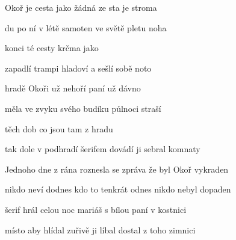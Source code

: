 

\zs
{} Okoř je cesta jako žádná ze sta  je stroma

 du po ní v létě samoten ve světě  pletu noha

 konci té cesty   krčma jako 

 zapadlí trampi hladoví a sešlí  sobě noto
\ks

\zr
{} hradě Okoři  už nehoří  paní  už dávno 

 měla ve zvyku  svého budíku  půlnoci  straší

 těch dob co jsou tam   z hradu 

 tak dole v podhradí  šerifem dovádí  ji sebral  komnaty 
\kr

\zs
Jednoho dne z rána roznesla se zpráva že byl Okoř vykraden

nikdo neví dodnes kdo to tenkrát odnes nikdo nebyl dopaden

šerif hrál celou noc mariáš s bílou paní v kostnici

místo aby hlídal zuřivě ji líbal dostal z toho zimnici
\ks

\zr \kr

\kp























